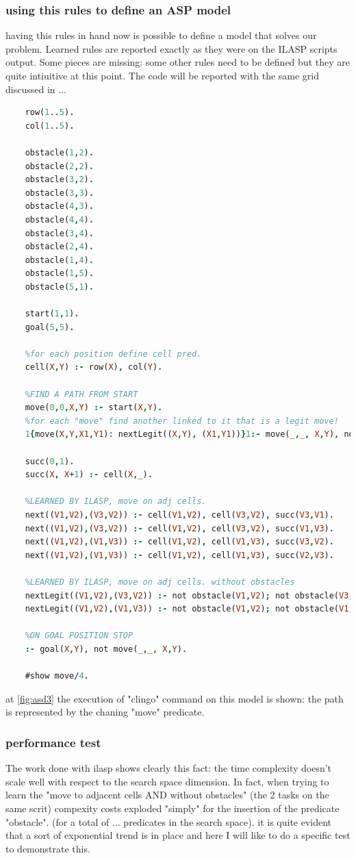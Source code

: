 \newpage

\subsubsection{using this rules to define an ASP model}
having this rules in hand now is possible to define a model that solves our problem. Learned rules are reported exactly as they were on the ILASP scripts output. Some pieces are missing: some other rules need to be defined but they are quite intiuitive at this point. The code will be reported with the same grid discussed in ...
 
\begin{lstlisting}[language=Prolog]
	%MODEL THAT SOLVES PROBLEM OF PATHFINDING IN THE GRID
	row(1..5).
	col(1..5).
	
	obstacle(1,2).
	obstacle(2,2).
	obstacle(3,2).
	obstacle(3,3).
	obstacle(4,3).
	obstacle(4,4).
	obstacle(3,4).
	obstacle(2,4).
	obstacle(1,4).
	obstacle(1,5).
	obstacle(5,1).
	
	start(1,1).
	goal(5,5).
	
	%for each position define cell pred.
	cell(X,Y) :- row(X), col(Y).
	
	%FIND A PATH FROM START
	move(0,0,X,Y) :- start(X,Y).
	%for each "move" find another linked to it that is a legit move!
	1{move(X,Y,X1,Y1): nextLegit((X,Y), (X1,Y1))}1:- move(_,_, X,Y), not goal(X,Y).
	
	succ(0,1).
	succ(X, X+1) :- cell(X,_).
	
	%LEARNED BY ILASP, move on adj cells.
	next((V1,V2),(V3,V2)) :- cell(V1,V2), cell(V3,V2), succ(V3,V1).
	next((V1,V2),(V3,V2)) :- cell(V1,V2), cell(V3,V2), succ(V1,V3).
	next((V1,V2),(V1,V3)) :- cell(V1,V2), cell(V1,V3), succ(V3,V2).
	next((V1,V2),(V1,V3)) :- cell(V1,V2), cell(V1,V3), succ(V2,V3).
	
	%LEARNED BY ILASP, move on adj cells. without obstacles
	nextLegit((V1,V2),(V3,V2)) :- not obstacle(V1,V2); not obstacle(V3,V2); next((V3,V2),(V1,V2)).
	nextLegit((V1,V2),(V1,V3)) :- not obstacle(V1,V2); not obstacle(V1,V3); next((V1,V2),(V1,V3)).
	
	%ON GOAL POSITION STOP
	:- goal(X,Y), not move(_,_, X,Y).
	
	#show move/4.
\end{lstlisting}

at \ref{fig:asd3} the execution of "clingo" command on this model is shown: the path is represented by the chaning "move" predicate.

\subsubsection{performance test}
The work done with ilasp shows clearly this fact: the time complexity doesn't scale well with respect to the search space dimension. In fact, when trying to learn the "move to adjacent cells AND without obstacles" (the 2 tasks on the same scrit) compexity costs exploded "simply" for the insertion of the predicate "obstacle". (for a total of ... predicates in the search space). it is quite evident that a sort of exponential trend is in place and here I will like to do a specific test to demonstrate this.




